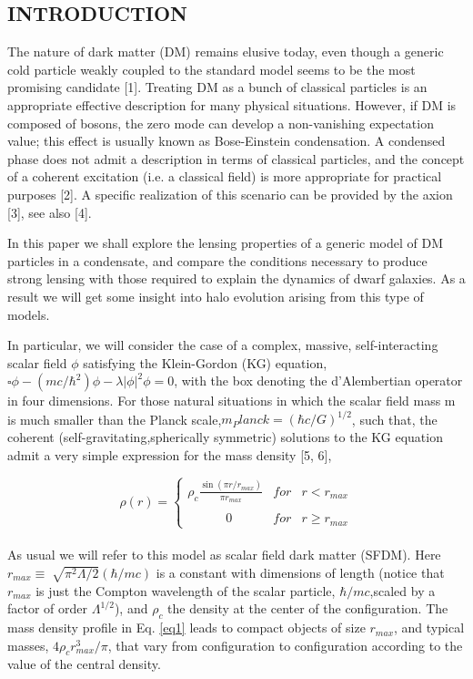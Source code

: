 \documentclass[10pt,a4paper]{article}
\begin{document}
\begin{multicols}{2}
\thispagestyle{empty}
\section{INTRODUCTION}

The nature of dark matter (DM) remains elusive today,
even though a generic cold particle weakly coupled to the
standard model seems to be the most promising candidate [1]. Treating DM as a bunch of classical particles is
an appropriate effective description for many physical situations. However, if DM is composed of bosons, the zero
mode can develop a non-vanishing expectation value; this
effect is usually known as Bose-Einstein condensation. A
condensed phase does not admit a description in terms
of classical particles, and the concept of a coherent excitation (i.e. a classical field) is more appropriate for practical purposes [2]. A specific realization of this scenario
can be provided by the axion [3], see also [4].\par
In this paper we shall explore the lensing properties
of a generic model of DM particles in a condensate, and
compare the conditions necessary to produce strong lensing with those required to explain the dynamics of dwarf
galaxies. As a result we will get some insight into halo
evolution arising from this type of models.\par
In particular, we will consider the case of a complex, massive, self-interacting scalar field $\phi$ satisfying the Klein-Gordon (KG) equation,$\square\phi-(mc/\hbar^2)\phi-\lambda|\phi|^2\phi = 0$, with the box denoting the d’Alembertian operator in four dimensions. For those natural situations in which the scalar field mass m is much smaller than the Planck scale,$m_Planck = (\hbar c/G)^{1/2}$, such that, the coherent (self-gravitating,spherically symmetric) solutions to the KG equation admit a very simple expression for the mass density [5, 6],


\begin{equation}
\rho(r)= \left\{ \begin{array}{lcc}
              \rho_c \frac{\sin(\pi r/r_{max})}{\pi r_{max}} &   for  & r < r_{max} \\
             \\ \qquad \quad 0 &  for & r \geq r_{max}
             \end{array}
   \right.
\label{eq1}
\end{equation}
\\
As usual we will refer to this model as scalar field dark matter (SFDM). Here $r_{max} \equiv \sqrt[]{\pi^2 \Lambda/2}(\hbar/mc)$ is a constant with dimensions of length (notice that $r_{max}$ is just the Compton wavelength of the scalar particle, $\hbar/mc$,scaled by a factor of order $\Lambda^{1/2}$), and $\rho_c$ the density at the center of the configuration. The mass density profile
in Eq. \eqref{eq1} leads to compact objects of size $r_{max}$, and typical masses, $4\rho_c r_{max}^3/ \pi$, that vary from configuration to configuration according to the value of the central density. \\


\end{multicols}
\end{document}
